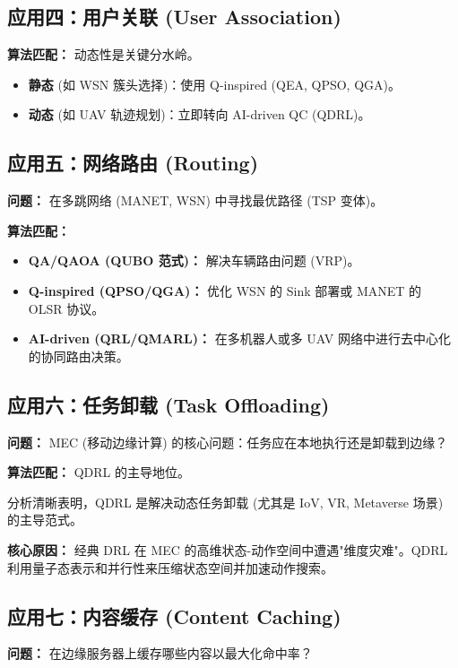 \documentclass[11pt,a4paper]{article}
\begin{document}
\subsection{应用四：用户关联 (User Association)}

\textbf{算法匹配：} 动态性是关键分水岭。

\begin{itemize}
\item \textbf{静态} (如 WSN 簇头选择)：使用 Q-inspired (QEA, QPSO, QGA)。
\item \textbf{动态} (如 UAV 轨迹规划)：立即转向 AI-driven QC (QDRL)。
\end{itemize}

\subsection{应用五：网络路由 (Routing)}

\textbf{问题：} 在多跳网络 (MANET, WSN) 中寻找最优路径 (TSP 变体)。

\textbf{算法匹配：}
\begin{itemize}
\item \textbf{QA/QAOA (QUBO 范式)：} 解决车辆路由问题 (VRP)。
\item \textbf{Q-inspired (QPSO/QGA)：} 优化 WSN 的 Sink 部署或 MANET 的 OLSR 协议。
\item \textbf{AI-driven (QRL/QMARL)：} 在多机器人或多 UAV 网络中进行去中心化的协同路由决策。
\end{itemize}

\subsection{应用六：任务卸载 (Task Offloading)}

\textbf{问题：} MEC (移动边缘计算) 的核心问题：任务应在本地执行还是卸载到边缘？

\textbf{算法匹配：} QDRL 的主导地位。

分析清晰表明，QDRL 是解决动态任务卸载 (尤其是 IoV, VR, Metaverse 场景) 的主导范式。

\textbf{核心原因：} 经典 DRL 在 MEC 的高维状态-动作空间中遭遇"维度灾难"。QDRL 利用量子态表示和并行性来压缩状态空间并加速动作搜索。

\subsection{应用七：内容缓存 (Content Caching)}

\textbf{问题：} 在边缘服务器上缓存哪些内容以最大化命中率？
\end{document}
